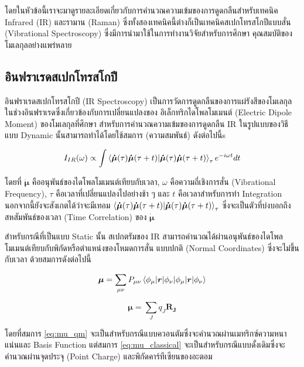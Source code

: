 โดยในหัวข้อนี้เราจะมาดูรายละเอียดเกี่ยวกับการคำนวณความเข้มของการดูดกลืนสำหรับเทคนิค Infrared (IR) และรามาน (Raman) 
ซึ่งทั้งสองเทคนิคนี้ต่างก็เป็นเทคนิคสเปกโทรสโกปีแบบสั่น (Vibrational Spectroscopy) ซึ่งมีการนำมาใช้ในการทำงานวิจัยสำหรับการศึกษา%
คุณสมบัติของโมเลกุลอย่างแพร่หลาย

\subsection{อินฟราเรดสเปกโทรสโกปี}
\label{ssec:ir_spectro}

อินฟราเรดสเปกโทรสโกปี (IR Spectroscopy) เป็นการวัดการดูดกลืนของการแผ่รังสีของโมเลกุลในช่วงอินฟราเรดซึ่งเกี่ยวข้องกับการเปลี่ยนแปลงของ%
อิเล็กทริกไดโพลโมเมนต์ (Electric Dipole Moment) ของโมเลกุลที่ศึกษา สำหรับการคำนวณความเข้มของการดูดกลืน IR ในรูปแบบของวิธีแบบ
Dynamic นั้นสามารถทำได้โดยใช้สมการ (ความสมพันธ์) ดังต่อไปนี้s\autocite{thomas2013}

\begin{equation}\label{eq:IR_corr}
    I_{IR} (\omega) \propto \int \braket{\bm{\dot{\mu}}(\tau) \bm{\dot{\mu}}(\tau+t)}_{\tau} e^{-i \omega t} dt
\end{equation}

\noindent โดยที่ $\bm{\dot{\mu}}$ คืออนุพันธ์ของไดโพลโมเมนต์เทียบกับเวลา, $\omega$ คือความถี่เชิงการสั่น (Vibrational Frequency),
$\tau$ คือเวลาที่เปลี่ยนแปลงไปอย่างช้า ๆ และ $t$ คือเวลาสำหรับการทำ Integration นอกจากนี้ยังจะสังเกตได้ว่าจะมีเทอม
$\braket{\bm{\dot{\mu}}(\tau) \bm{\dot{\mu}}(\tau+t)}_{\tau}$ ซึ่งจะเป็นตัวที่บ่งบอกถึงสหสัมพันธ์ของเวลา (Time Correlation) 
ของ $\bm{\dot{\mu}}$ 

สำหรับกรณีที่เป็นแบบ Static นั้น สเปกตรัมของ IR สามารถคำนวณได้ผ่านอนุพันธ์ของไดโพลโมเมนต์เทียบกับพิกัดหรือตำแหน่งของโหมดการสั่น%
แบบปกติ (Normal Coordinates) ซึ่งจะไม่ขึ้นกับเวลา ด้วยสมการดังต่อไปนี้

\begin{equation}\label{eq:mu_qm}
    \bm{\mu}= \sum_{\mu\nu} P_{\mu\nu} \braket{\phi_{\mu}|\bm{r}|\phi_{\nu}}
\end{equation}

\begin{equation}\label{eq:mu_classical}
    \bm{\mu}=\sum_{J} q_J \bm{R_J}
\end{equation}

โดยที่สมการ \ref{eq:mu_qm} จะเป็นสำหรับกรณีแบบควอนตัมซึ่งจะคำนวณผ่านเมทริกซ์ความหนาแน่นและ Basis Function แต่สมการ 
\ref{eq:mu_classical} จะเป็นสำหรับกรณีแบบดั้งเดิมซึ่งจะคำนวณผ่านจุดประจุ (Point Charge) และพิกัดคาร์ทีเซียนของอะตอม

